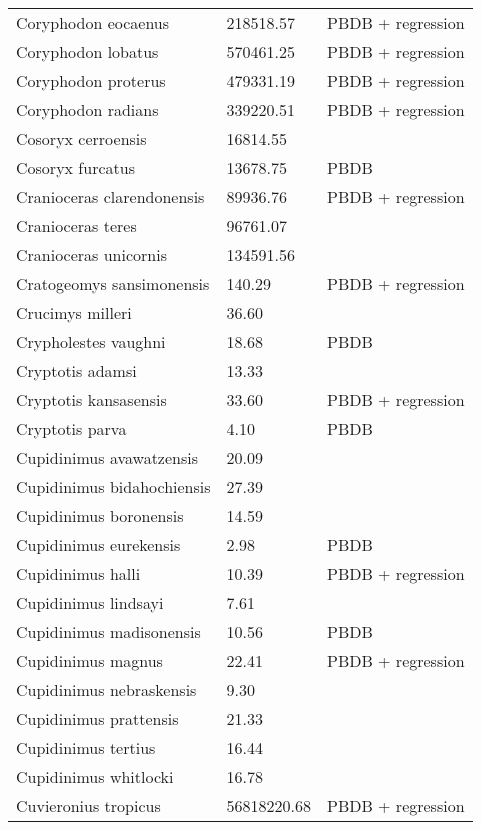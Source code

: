 \documentclass{article}
\begin{document}
\begin{center}
\begin{longtable}{p{} p{} p{}}
    Coryphodon eocaenus & 218518.57 & PBDB + regression \\ 
    Coryphodon lobatus & 570461.25 & PBDB + regression \\ 
    Coryphodon proterus & 479331.19 & PBDB + regression \\ 
    Coryphodon radians & 339220.51 & PBDB + regression \\ 
    Cosoryx cerroensis & 16814.55 & \cite{Tomiya2013} \\ 
    Cosoryx furcatus & 13678.75 & PBDB \\ 
    Cranioceras clarendonensis & 89936.76 & PBDB + regression \\ 
    Cranioceras teres & 96761.07 & \cite{Tomiya2013} \\ 
    Cranioceras unicornis & 134591.56 & \cite{Tomiya2013} \\ 
    Cratogeomys sansimonensis & 140.29 & PBDB + regression \\ 
    Crucimys milleri & 36.60 & \cite{Tomiya2013} \\ 
    Crypholestes vaughni & 18.68 & PBDB \\ 
    Cryptotis adamsi & 13.33 & \cite{Tomiya2013} \\ 
    Cryptotis kansasensis & 33.60 & PBDB + regression \\ 
    Cryptotis parva & 4.10 & PBDB \\ 
    Cupidinimus avawatzensis & 20.09 & \cite{Tomiya2013} \\ 
    Cupidinimus bidahochiensis & 27.39 & \cite{Tomiya2013} \\ 
    Cupidinimus boronensis & 14.59 & \cite{Tomiya2013} \\ 
    Cupidinimus eurekensis & 2.98 & PBDB \\ 
    Cupidinimus halli & 10.39 & PBDB + regression \\ 
    Cupidinimus lindsayi & 7.61 & \cite{Tomiya2013} \\ 
    Cupidinimus madisonensis & 10.56 & PBDB \\ 
    Cupidinimus magnus & 22.41 & PBDB + regression \\ 
    Cupidinimus nebraskensis & 9.30 & \cite{Tomiya2013} \\ 
    Cupidinimus prattensis & 21.33 & \cite{Tomiya2013} \\ 
    Cupidinimus tertius & 16.44 & \cite{Tomiya2013} \\ 
    Cupidinimus whitlocki & 16.78 & \cite{Tomiya2013} \\ 
    Cuvieronius tropicus & 56818220.68 & PBDB + regression \\ 

\end{longtable}
\end{center}
\end{document}

